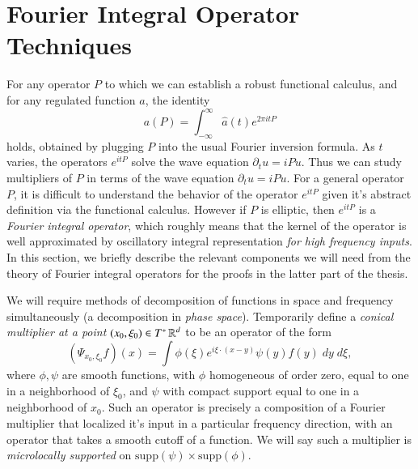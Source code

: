 \section{Fourier Integral Operator Techniques} \label{sec:FourierIntegral}

For any operator $P$ to which we can establish a robust functional calculus, and for any regulated function $a$, the identity
%
\begin{equation}
  a(P) = \int_{-\infty}^\infty \widehat{a}(t) e^{2 \pi itP}
\end{equation}
%
holds, obtained by plugging $P$ into the usual Fourier inversion formula. As $t$ varies, the operators $e^{itP}$ solve the wave equation $\partial_t u = i P u$. Thus we can study multipliers of $P$ in terms of the wave equation $\partial_t u = i P u$. For a general operator $P$, it is difficult to understand the behavior of the operator $e^{i t P}$ given it's abstract definition via the functional calculus. However if $P$ is elliptic, then $e^{i t P}$ is a \emph{Fourier integral operator}, which roughly means that the kernel of the operator is well approximated by oscillatory integral representation \emph{for high frequency inputs}. In this section, we briefly describe the relevant components we will need from the theory of Fourier integral operators for the proofs in the latter part of the thesis.

We will require methods of decomposition of functions in space and frequency simultaneously (a decomposition in \emph{phase space}). Temporarily define a \emph{conical multiplier at a point $(x_0,\xi_0) \in T^* \operatorname{\mathbb{R}}^d$} to be an operator of the form
%
\begin{equation}
  (\Psi_{x_0,\xi_0} f)(x) = \int \phi( \xi ) e^{i \xi \cdot (x - y)} \psi(y) f(y)\; dy\; d\xi,
\end{equation}
%
where $\phi,\psi$ are smooth functions, with $\phi$ homogeneous of order zero, equal to one in a neighborhood of $\xi_0$, and $\psi$ with compact support equal to one in a neighborhood of $x_0$. Such an operator is precisely a composition of a Fourier multiplier that localized it's input in a particular frequency direction, with an operator that takes a smooth cutoff of a function. We will say such a multiplier is \emph{microlocally supported} on $\text{supp}(\psi) \times \text{supp}(\phi)$.

